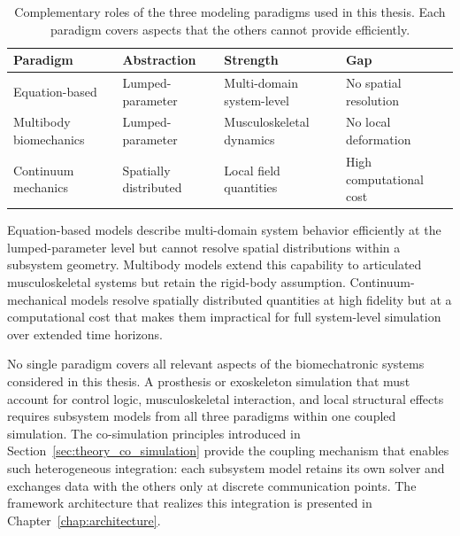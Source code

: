 \begin{table}[htbp]
    \centering
    \small
    \begin{tabular}{llll}
        \toprule
        \textbf{Paradigm}
            & \textbf{Abstraction}
            & \textbf{Strength}
            & \textbf{Gap} \\
        \midrule
        Equation-based
            & Lumped-parameter
            & Multi-domain system-level
            & No spatial resolution \\
        Multibody biomechanics
            & Lumped-parameter
            & Musculoskeletal dynamics
            & No local deformation \\
        Continuum mechanics
            & Spatially distributed
            & Local field quantities
            & High computational cost \\
        \bottomrule
    \end{tabular}
    \caption{Complementary roles of the three modeling paradigms used
             in this thesis.
             Each paradigm covers aspects that the others cannot
             provide efficiently.}
    \label{tab:modeling_complementarity}
\end{table}

Equation-based models describe multi-domain system behavior efficiently at the lumped-parameter level but cannot resolve spatial distributions within a subsystem geometry.
Multibody models extend this capability to articulated musculoskeletal systems but retain the rigid-body assumption.
Continuum-mechanical models resolve spatially distributed quantities at high fidelity but at a computational cost that makes them impractical for full system-level simulation over extended time horizons.

No single paradigm covers all relevant aspects of the biomechatronic systems considered in this thesis.
A prosthesis or exoskeleton simulation that must account for control logic, musculoskeletal interaction, and local structural effects requires subsystem models from all three paradigms within one coupled simulation.
The co-simulation principles introduced in Section~\ref{sec:theory_co_simulation} provide the coupling mechanism that enables such heterogeneous integration: each
subsystem model retains its own solver and exchanges data with the others only at discrete communication points.
The framework architecture that realizes this integration is presented in Chapter~\ref{chap:architecture}.
